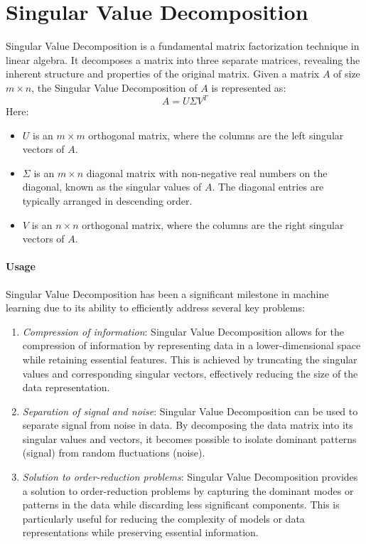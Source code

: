 \section{Singular Value Decomposition}

Singular Value Decomposition is a fundamental matrix factorization technique in linear algebra. 
It decomposes a matrix into three separate matrices, revealing the inherent structure and properties of the original matrix. 
Given a matrix $A$ of size $m \times n$, the Singular Value Decomposition of $A$ is represented as:
\[A=U\Sigma V^T\]
Here: 
\begin{itemize}
    \item $U$ is an $m \times m$ orthogonal matrix, where the columns are the left singular vectors of $A$. 
    \item $\Sigma$ is an $m \times n$ diagonal matrix with non-negative real numbers on the diagonal, known as the singular values of $A$. 
        The diagonal entries are typically arranged in descending order.
    \item $V$ is an $n \times n$ orthogonal matrix, where the columns are the right singular vectors of $A$.
\end{itemize} 

\paragraph*{Usage}
Singular Value Decomposition has been a significant milestone in machine learning due to its ability to efficiently address several key problems:
\begin{enumerate}
    \item \textit{Compression of information}: Singular Value Decomposition allows for the compression of information by representing data in a lower-dimensional space while retaining essential features. 
        This is achieved by truncating the singular values and corresponding singular vectors, effectively reducing the size of the data representation.
    \item \textit{Separation of signal and noise}: Singular Value Decomposition can be used to separate signal from noise in data. 
        By decomposing the data matrix into its singular values and vectors, it becomes possible to isolate dominant patterns (signal) from random fluctuations (noise).
    \item \textit{Solution to order-reduction problems}: Singular Value Decomposition provides a solution to order-reduction problems by capturing the dominant modes or patterns in the data while discarding less significant components. 
        This is particularly useful for reducing the complexity of models or data representations while preserving essential information.
\end{enumerate}

